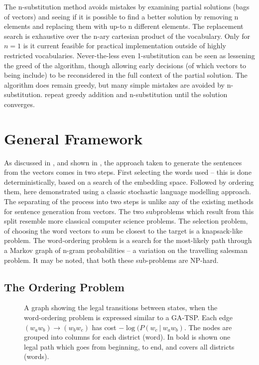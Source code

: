 \documentclass[11pt]{article}
\theoremstyle{plain}
\theoremstyle{definition}
\begin{document}
The n-substitution method avoids mistakes by examining partial solutions (bags of vectors) and seeing if it is possible to find a better solution by removing n elements and replacing them with up-to n different elements. The replacement search is exhaustive over the n-ary cartesian product of the vocabulary. Only for $n=1$ is it current feasible for practical implementation outside of highly restricted vocabularies. Never-the-less even 1-substitution can be seen as lessening the greed of the algorithm, though allowing early decisions (of which vectors to being include) to be reconsidered in the full context of the partial solution. The algorithm does remain greedy, but many simple mistakes are avoided by n-substitution. \textcite{White2015BOWgen} repeat greedy addition and n-substitution until the solution converges.




\section{General Framework}\label{framework}
As discussed in , and shown in , the approach taken to generate the sentences from the vectors comes in two steps. First selecting the words used -- this is done deterministically, based on a search of the embedding space. Followed by ordering them, here demonstrated using a classic stochastic language modelling approach. The separating of the process into two steps is unlike any of the existing methods for sentence generation from vectors. The two subproblems which result from this split resemble more classical computer science problems. The selection problem, of choosing the word vectors to sum be closest to the target is a knapsack-like problem. The word-ordering problem is a search for the most-likely path through a Markov graph of n-gram probabilities -- a variation on the travelling salesman problem. It may be noted, that both these sub-problems are NP-hard.


\subsection{The Ordering Problem} \label{ordering}
\begin{figure*}
	\begin{center}
	
	\end{center}
	\caption{\label{fig:ordergraph} A graph showing the legal transitions between states, when the word-ordering problem is expressed similar to a GA-TSP. Each edge $(w_aw_b)\to (w_bw_c)$ has cost $-\log(P(w_c\:|\:w_aw_b)$. The nodes are grouped into columns for each district (word). In bold is shown one legal path which goes from beginning, to end, and covers all districts (words).} 
\end{figure*}
\end{document}
